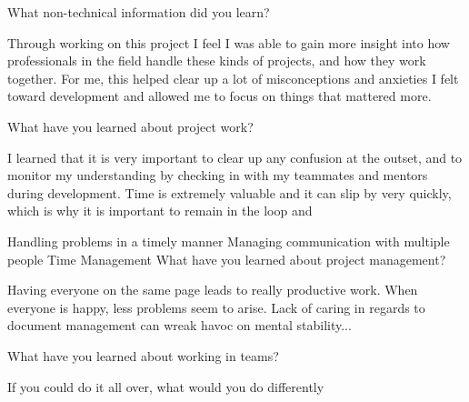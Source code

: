 \documentclass[letterpaper, 10pt, draftclsnofoot, compsoc, onecolumn]{IEEEtran}
\begin{document}
What non-technical information did you learn?

Through working on this project I feel I was able to gain more insight into how professionals in the field handle these kinds of projects, and how they work together. For me, this helped clear up a lot of misconceptions and anxieties I felt toward development and allowed me to focus on things that mattered more.



What have you learned about project work?

I learned that it is very important to clear up any confusion at the outset, and to monitor my understanding by checking in with my teammates and mentors during development. Time is extremely valuable and it can slip by very quickly, which is why it is important to remain in the loop and 

Handling problems in a timely manner
Managing communication with multiple people
Time Management
What have you learned about project management?

Having everyone on the same page leads to really productive work. When everyone is happy, less problems seem to arise. Lack of caring in regards to document management can wreak havoc on mental stability...

What have you learned about working in teams?

If you could do it all over, what would you do differently
\end{document}
